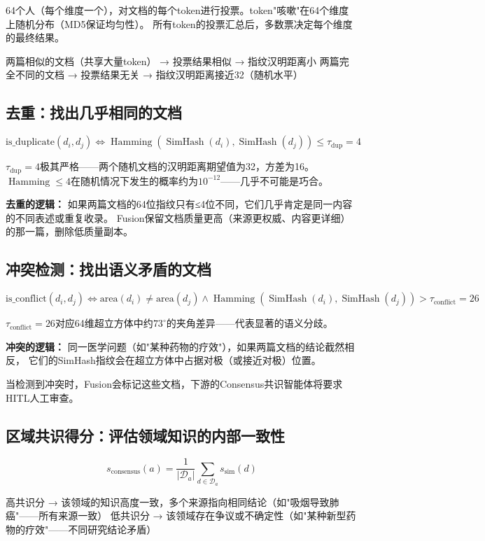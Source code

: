 \documentclass[11pt,a4paper]{ctexart}
\DeclareMathOperator{\Ham}{Hamming}
\DeclareMathOperator{\simhash}{SimHash}
\begin{document}
\begin{exambox}
64个人（每个维度一个），对文档的每个token进行投票。token"咳嗽"在64个维度上随机分布（MD5保证均匀性）。
所有token的投票汇总后，多数票决定每个维度的最终结果。

两篇相似的文档（共享大量token） → 投票结果相似 → 指纹汉明距离小
两篇完全不同的文档 → 投票结果无关 → 指纹汉明距离接近32（随机水平）
\end{exambox}

\subsection{去重：找出几乎相同的文档}

$$\text{is\_duplicate}(d_i, d_j) \iff \Ham(\simhash(d_i), \simhash(d_j)) \leq \tau_{\text{dup}} = 4$$

$\tau_{\text{dup}} = 4$极其严格——两个随机文档的汉明距离期望值为32，方差为16。
$\Ham \leq 4$在随机情况下发生的概率约为$10^{-12}$——几乎不可能是巧合。

\textbf{去重的逻辑：} 如果两篇文档的64位指纹只有≤4位不同，它们几乎肯定是同一内容的不同表述或重复收录。
Fusion保留文档质量更高（来源更权威、内容更详细）的那一篇，删除低质量副本。

\subsection{冲突检测：找出语义矛盾的文档}

$$\text{is\_conflict}(d_i, d_j) \iff \text{area}(d_i) \neq \text{area}(d_j) \land \Ham(\simhash(d_i), \simhash(d_j)) > \tau_{\text{conflict}} = 26$$

$\tau_{\text{conflict}} = 26$对应64维超立方体中约$73^\circ$的夹角差异——代表显著的语义分歧。

\textbf{冲突的逻辑：} 同一医学问题（如"某种药物的疗效"），如果两篇文档的结论截然相反，
它们的SimHash指纹会在超立方体中占据对极（或接近对极）位置。

当检测到冲突时，Fusion会标记这些文档，下游的Consensus共识智能体将要求HITL人工审查。

\subsection{区域共识得分：评估领域知识的内部一致性}

$$s_{\text{consensus}}(a) = \frac{1}{|\mathcal{D}_a|}\sum_{d \in \mathcal{D}_a} s_{\text{sim}}(d)$$

高共识分 → 该领域的知识高度一致，多个来源指向相同结论（如"吸烟导致肺癌"——所有来源一致）
低共识分 → 该领域存在争议或不确定性（如"某种新型药物的疗效"——不同研究结论矛盾）
\end{document}
